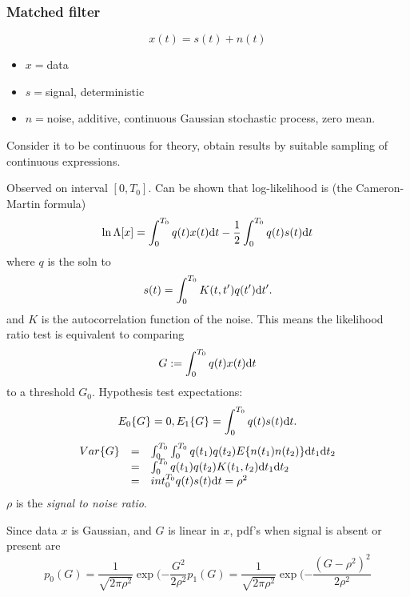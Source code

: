 \subsubsection{Matched filter}
\begin{equation}
x(t)=s(t)+n(t)
\end{equation}
\begin{itemize}
\item $x=$data
\item $s=$signal, deterministic
\item $n=$noise, additive, continuous Gaussian stochastic process, zero mean. 
\end{itemize}
Consider it to be continuous for theory, obtain results by suitable sampling of continuous expressions.

Observed on interval $[0,T_0]$. Can be shown that log-likelihood is (the Cameron-Martin formula)
\begin{equation}
\label{eq:Cameron-Martin}
\ln \Lambda [x] =  \int_0^{T_0}q(t)x(t){\mbox{d}} t - \frac{1}{2}\int_0^{T_0}q(t)s(t){\mbox{d}} t
\end{equation}
where $q$ is the soln to
\begin{equation}
s(t) = \int_0^{T_0} K(t,t')q(t'){\mbox{d}} t'.
\end{equation}
and $K$ is the autocorrelation function of the noise. This means the likelihood ratio test is equivalent to comparing 
\begin{equation}
G:=\int_0^{T_0}q(t)x(t){\mbox{d}} t
\end{equation}
to a threshold $G_0$. Hypothesis test expectations:
\begin{equation}
E_0\{G\}=0,\\
E_1\{G\} = \int_0^{T_0}q(t)s(t){\mbox{d}} t.
\end{equation}
\begin{equation}
\begin{array}{rcl}
Var\{G\}&=& \int_0^{T_0}\int_0^{T_0}q(t_1)q(t_2)E\{n(t_1)n(t_2)\}{\mbox{d}} t_1  {\mbox{d}} t_2 \\
&=&\int_0^{T_0}q(t_1)q(t_2)K(t_1,t_2){\mbox{d}} t_1  {\mbox{d}} t_2\\
&=&int_0^{T_0}q(t)s(t){\mbox{d}} t = \rho^2
\end{array}
\end{equation}
$\rho$ is the \textit{signal to noise ratio}.

Since data $x$ is Gaussian, and $G$ is linear in $x$, pdf's when signal is absent or present are
\begin{equation}
p_0(G)=\frac{1}{\sqrt{2\pi\rho^2}}\exp(-\frac{G^2}{2\rho^2}
p_1(G)=\frac{1}{\sqrt{2\pi\rho^2}}\exp(-\frac{(G-\rho^2)^2}{2\rho^2}
\end{equation}



